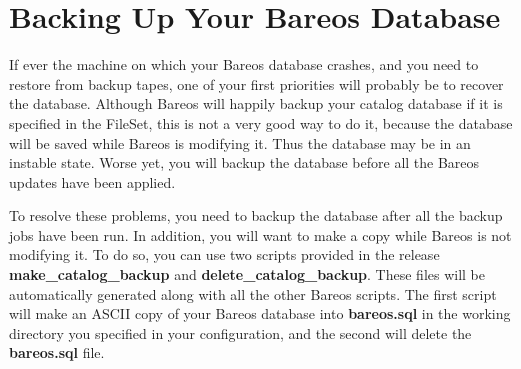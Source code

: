 
\section{Backing Up Your Bareos Database}
\label{BackingUpBareos}

If ever the machine on which your Bareos database crashes, and you need to
restore from backup tapes, one of your first priorities will probably be to
recover the database. Although Bareos will happily backup your catalog
database if it is specified in the FileSet, this is not a very good way to do
it, because the database will be saved while Bareos is modifying it. Thus the
database may be in an instable state. Worse yet, you will backup the database
before all the Bareos updates have been applied.

To resolve these problems, you need to backup the database after all the backup
jobs have been run. In addition, you will want to make a copy while Bareos is
not modifying it. To do so, you can use two scripts provided in the release
{\bf make\_catalog\_backup} and {\bf delete\_catalog\_backup}. These files
will be automatically generated along with all the other Bareos scripts. The
first script will make an ASCII copy of your Bareos database into {\bf
bareos.sql} in the working directory you specified in your configuration, and
the second will delete the {\bf bareos.sql} file.

